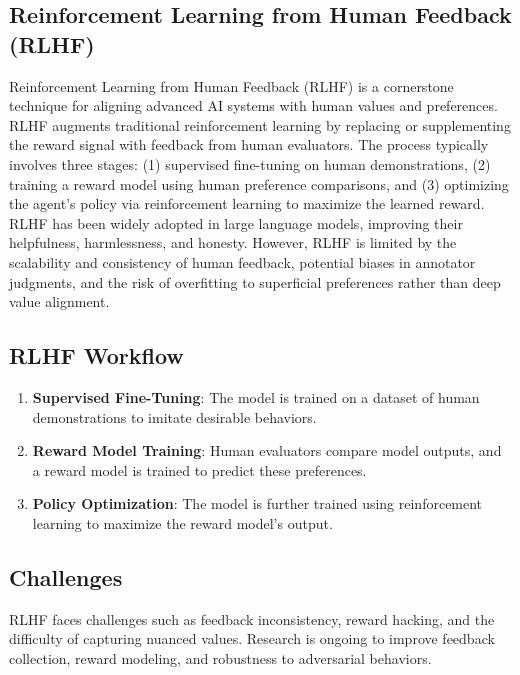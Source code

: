 
\begin{TNtwocol}

\section{Reinforcement Learning from Human Feedback (RLHF)}
Reinforcement Learning from Human Feedback (RLHF) is a cornerstone technique for aligning advanced AI systems with human values and preferences. RLHF augments traditional reinforcement learning by replacing or supplementing the reward signal with feedback from human evaluators. The process typically involves three stages: (1) supervised fine-tuning on human demonstrations, (2) training a reward model using human preference comparisons, and (3) optimizing the agent’s policy via reinforcement learning to maximize the learned reward. RLHF has been widely adopted in large language models, improving their helpfulness, harmlessness, and honesty. However, RLHF is limited by the scalability and consistency of human feedback, potential biases in annotator judgments, and the risk of overfitting to superficial preferences rather than deep value alignment.

\subsection{RLHF Workflow}
\begin{enumerate}
    \item \textbf{Supervised Fine-Tuning}: The model is trained on a dataset of human demonstrations to imitate desirable behaviors.
    \item \textbf{Reward Model Training}: Human evaluators compare model outputs, and a reward model is trained to predict these preferences.
    \item \textbf{Policy Optimization}: The model is further trained using reinforcement learning to maximize the reward model’s output.
\end{enumerate}

\subsection{Challenges}
RLHF faces challenges such as feedback inconsistency, reward hacking, and the difficulty of capturing nuanced values. Research is ongoing to improve feedback collection, reward modeling, and robustness to adversarial behaviors.


\end{TNtwocol}
